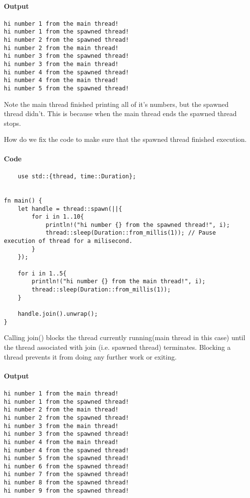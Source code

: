 \paragraph*{Output}\begin{lstlisting}
hi number 1 from the main thread!
hi number 1 from the spawned thread!
hi number 2 from the spawned thread!
hi number 2 from the main thread!
hi number 3 from the spawned thread!
hi number 3 from the main thread!
hi number 4 from the spawned thread!
hi number 4 from the main thread!
hi number 5 from the spawned thread!
\end{lstlisting}
Note the main thread finished printing all of it's numbers, but the spawned thread didn't. This is because when the main thread ends the spawned thread stops.

How do we fix the code to make sure that the spawned thread finished execution.

\paragraph*{Code}\begin{lstlisting}
    use std::{thread, time::Duration};


fn main() {
    let handle = thread::spawn(||{
        for i in 1..10{
            println!("hi number {} from the spawned thread!", i);
            thread::sleep(Duration::from_millis(1)); // Pause execution of thread for a milisecond.
        }
    });

    for i in 1..5{
        println!("hi number {} from the main thread!", i);
        thread::sleep(Duration::from_millis(1));
    }

    handle.join().unwrap();
}
\end{lstlisting}
Calling join() blocks the thread currently running(main thread in this case) until the  thread associated with join (i.e. spawned thread) terminates. Blocking a thread prevents it from doing any further work or exiting. 

\paragraph*{Output}\begin{lstlisting}
hi number 1 from the main thread!
hi number 1 from the spawned thread!
hi number 2 from the main thread!
hi number 2 from the spawned thread!
hi number 3 from the main thread!
hi number 3 from the spawned thread!
hi number 4 from the main thread!
hi number 4 from the spawned thread!
hi number 5 from the spawned thread!
hi number 6 from the spawned thread!
hi number 7 from the spawned thread!
hi number 8 from the spawned thread!
hi number 9 from the spawned thread!
\end{lstlisting}

